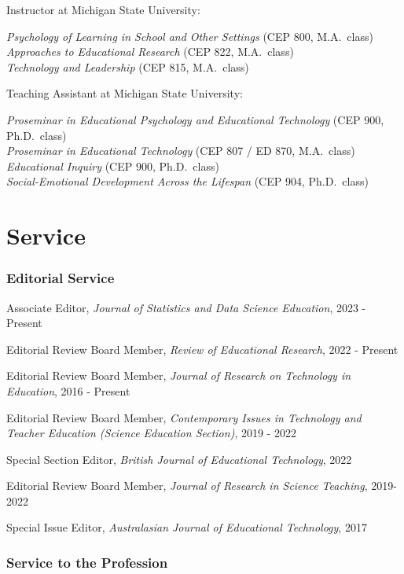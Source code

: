 \documentclass[
  14,
]{article}
\begin{document}
Instructor at Michigan State University:

\emph{Psychology of Learning in School and Other Settings} (CEP 800,
M.A.~class)\\
\emph{Approaches to Educational Research} (CEP 822, M.A.~class)\\
\emph{Technology and Leadership} (CEP 815, M.A.~class)

Teaching Assistant at Michigan State University:

\emph{Proseminar in Educational Psychology and Educational Technology}
(CEP 900, Ph.D.~class)\\
\emph{Proseminar in Educational Technology} (CEP 807 / ED 870,
M.A.~class)\\
\emph{Educational Inquiry} (CEP 900, Ph.D.~class)\\
\emph{Social-Emotional Development Across the Lifespan} (CEP 904,
Ph.D.~class)

\hypertarget{service}{%
\section{Service}\label{service}}

\hypertarget{editorial-service}{%
\subsubsection{Editorial Service}\label{editorial-service}}

Associate Editor, \emph{Journal of Statistics and Data Science
Education}, 2023 - Present

Editorial Review Board Member, \emph{Review of Educational Research},
2022 - Present

Editorial Review Board Member, \emph{Journal of Research on Technology
in Education}, 2016 - Present

Editorial Review Board Member, \emph{Contemporary Issues in Technology
and Teacher Education (Science Education Section)}, 2019 - 2022

Special Section Editor, \emph{British Journal of Educational
Technology}, 2022

Editorial Review Board Member, \emph{Journal of Research in Science
Teaching}, 2019-2022

Special Issue Editor, \emph{Australasian Journal of Educational
Technology}, 2017

\hypertarget{service-to-the-profession}{%
\subsubsection{Service to the
Profession}\label{service-to-the-profession}}
\end{document}
